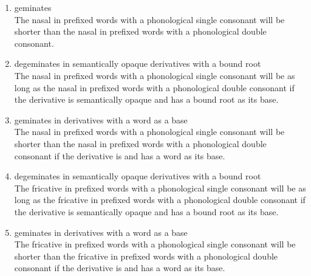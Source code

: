 \begin{enumerate}
	
	\item {} geminates \\
	The nasal in prefixed words with a phonological single consonant will be shorter than the nasal in prefixed words with a phonological double consonant. 
	
	\item{} degeminates in semantically opaque derivatives with a bound root\\
	The nasal in prefixed words with a phonological single consonant will be as long as the nasal in prefixed words with a phonological double consonant if  the derivative is semantically opaque and has a bound root as its base.
	
	
	
	\item {} geminates in  derivatives with a word as a base \\
	The nasal in prefixed words with a phonological single consonant will be shorter than the nasal in prefixed words with a phonological double consonant if  the derivative is  and has a word as its base.
	
	
	\item {} degeminates in semantically opaque derivatives with a bound root\\
	The fricative in prefixed words with a phonological single consonant will be as long as the fricative in prefixed words with a phonological double consonant if  the derivative is semantically opaque and has a bound root as its base.
	
	\item {} geminates in  derivatives with a word as a base \\
	The fricative in prefixed words with a phonological single consonant will be shorter than the fricative in prefixed words with a phonological double consonant if  the derivative is and has a word as its base.\\
	

\end{enumerate}
